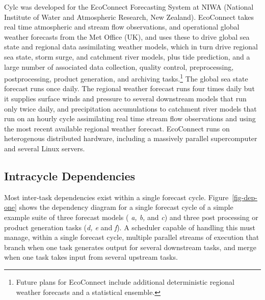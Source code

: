 \documentclass[11pt,a4paper]{article}
\begin{document}
Cylc was developed for the EcoConnect Forecasting System at NIWA
(National Institute of Water and Atmospheric Research, New Zealand).
EcoConnect takes real time atmospheric and stream flow observations, and
operational global weather forecasts from the Met Office (UK), and uses
these to drive global sea state and regional data assimilating weather
models, which in turn drive regional sea state, storm surge, and
catchment river models, plus tide prediction, and a large number of
associated data collection, quality control, preprocessing,
postprocessing, product generation, and archiving tasks.\footnote{Future
plans for EcoConnect include additional deterministic regional weather
forecasts and a statistical ensemble.} The global sea state forecast
runs once daily. The regional weather forecast runs four times daily but
it supplies surface winds and pressure to several downstream models that
run only twice daily, and precipitation accumulations to catchment river
models that run on an hourly cycle assimilating real time stream flow
observations and using the most recent available regional weather
forecast.  EcoConnect runs on heterogenous distributed hardware,
including a massively parallel supercomputer and several Linux servers. 

\subsection{Intracycle Dependencies} 
\label{IntracycleDependencies}

Most inter-task dependencies exist within a single forecast cycle.
Figure~\ref{fig-dep-one} shows the dependency diagram for a single
forecast cycle of a simple example suite of three forecast models ({\em
a, b,} and {\em c}) and three post processing or product generation
tasks ({\em d, e} and {\em f}). A scheduler capable of handling this
must manage, within a single forecast cycle, multiple parallel streams
of execution that branch when one task generates output for several
downstream tasks, and merge when one task takes input from several
upstream tasks. 
\end{document}
